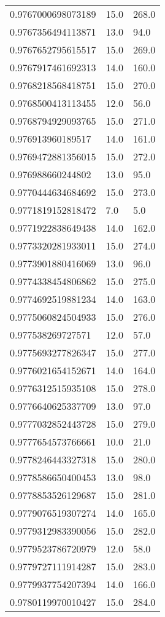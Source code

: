 \begin{center}
\begin{supertabular}[H]{p{0.30\textwidth}p{0.05\textwidth}p{0.05\textwidth}}
0.9767000698073189 & 15.0 & 268.0 \\ 
0.9767356494113871 & 13.0 & 94.0 \\ 
0.9767652795615517 & 15.0 & 269.0 \\ 
0.9767917461692313 & 14.0 & 160.0 \\ 
0.9768218568418751 & 15.0 & 270.0 \\ 
0.9768500413113455 & 12.0 & 56.0 \\ 
0.9768794929093765 & 15.0 & 271.0 \\ 
0.976913960189517 & 14.0 & 161.0 \\ 
0.9769472881356015 & 15.0 & 272.0 \\ 
0.976988660244802 & 13.0 & 95.0 \\ 
0.9770444634684692 & 15.0 & 273.0 \\ 
0.9771819152818472 & 7.0 & 5.0 \\ 
0.9771922838649438 & 14.0 & 162.0 \\ 
0.9773320281933011 & 15.0 & 274.0 \\ 
0.9773901880416069 & 13.0 & 96.0 \\ 
0.9774338454806862 & 15.0 & 275.0 \\ 
0.9774692519881234 & 14.0 & 163.0 \\ 
0.9775060824504933 & 15.0 & 276.0 \\ 
0.977538269727571 & 12.0 & 57.0 \\ 
0.9775693277826347 & 15.0 & 277.0 \\ 
0.9776021654152671 & 14.0 & 164.0 \\ 
0.9776312515935108 & 15.0 & 278.0 \\ 
0.9776640625337709 & 13.0 & 97.0 \\ 
0.9777032852443728 & 15.0 & 279.0 \\ 
0.9777654573766661 & 10.0 & 21.0 \\ 
0.9778246443327318 & 15.0 & 280.0 \\ 
0.9778586650400453 & 13.0 & 98.0 \\ 
0.9778853526129687 & 15.0 & 281.0 \\ 
0.9779076519307274 & 14.0 & 165.0 \\ 
0.9779312983390056 & 15.0 & 282.0 \\ 
0.9779523786720979 & 12.0 & 58.0 \\ 
0.9779727111914287 & 15.0 & 283.0 \\ 
0.9779937754207394 & 14.0 & 166.0 \\ 
0.9780119970010427 & 15.0 & 284.0 \\ 

\end{supertabular}
\end{center}
